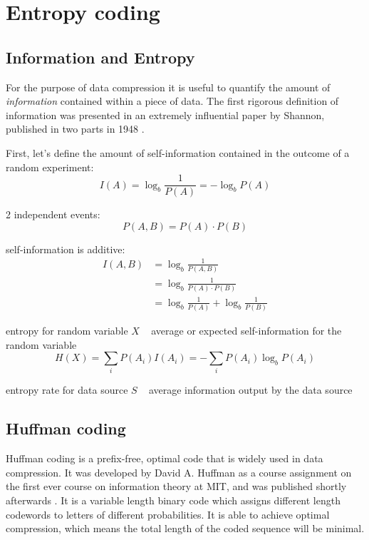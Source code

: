 \documentclass{diploma_style}
\begin{document}
\section{Entropy coding}
\subsection{Information and Entropy}
For the purpose of data compression it is useful to quantify the amount of \textit{information} contained within a piece of data. The first rigorous definition of information was presented in an extremely influential paper by Shannon, published in two parts in 1948 \cite{shannon_mathematical_1948, shannon_mathematical_1948-1}.

First, let's define the amount of self-information contained in the outcome of a random experiment:
\begin{equation}
I(A) = \log_b \frac{1}{P(A)} = - \log_b P(A)
\end{equation}

2 independent events:
\begin{equation}
P(A,B) = P(A) \cdot P(B)
\end{equation}

self-information is additive:
\begin{align}
I(A,B) &= \log_b \frac{1}{P(A,B)} \\
&= \log_b \frac{1}{P(A) \cdot P(B)} \\
&= \log_b \frac{1}{P(A)} + \log_b \frac{1}{P(B)}
\end{align}

entropy for random variable $X$ ~ average or expected self-information for the random variable
\begin{equation}
H(X) = \sum_i P(A_i)I(A_i) = - \sum_i P(A_i) \log_b P(A_i)
\end{equation}

entropy rate for data source $S$ ~ average information output by the data source

\subsection{Huffman coding}
Huffman coding is a prefix-free, optimal code that is widely used in data compression. It was developed by David A. Huffman as a course assignment on the first ever course on information theory at MIT, and was published shortly afterwards \cite{huffman_method_1952}. It is a variable length binary code which assigns different length codewords to letters of different probabilities. It is able to achieve optimal compression, which means the total length of the coded sequence will be minimal.
\end{document}
